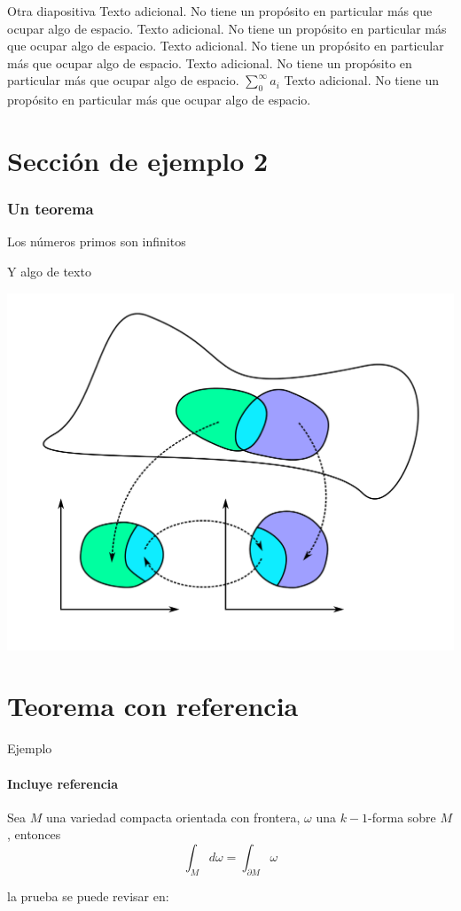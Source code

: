\begin{frame}{Otra diapositiva} %
Texto adicional. No tiene un propósito en particular más que ocupar algo de espacio.
Texto adicional. No tiene un propósito en particular más que ocupar algo de espacio.
Texto adicional. No tiene un propósito en particular más que ocupar algo de espacio.
Texto adicional. No tiene un propósito en particular más que ocupar algo de espacio.
\( \sum_0^{\infty} a_i \) 
Texto adicional. No tiene un propósito en particular más que ocupar algo de espacio.
\end{frame}

\section{Sección de ejemplo 2} %
\begin{frame}
    \frametitle{Un teorema}
    
    \begin{teorema} %
        Los números primos son infinitos
    \end{teorema}

    Y algo de texto
    
    \centering \includegraphics[width=0.45 \paperwidth]{images/Manifold1.png}
\end{frame}

\section{Teorema con referencia}
\begin{frame}{Ejemplo}
\framesubtitle{Incluye referencia}
    \begin{teorema}
        Sea $M$ una variedad compacta orientada con frontera, $\omega$ una $k-1$-forma sobre $M$, entonces $$\int_{M} d\omega = \int_{\partial M} \omega$$
    \end{teorema}

    la prueba se puede revisar en: \cite{spivak2018calculus}
\end{frame}

